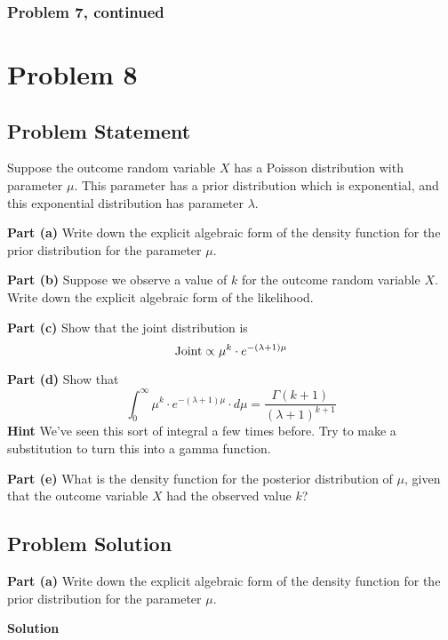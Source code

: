 \documentclass[12pt]{article}
\theoremstyle{definition}
\begin{document}
\newpage
\subsubsection*{Problem 7, continued}



\newpage
\section*{Problem 8}

\subsection*{Problem Statement}

Suppose the outcome random variable $X$ has a Poisson distribution with parameter $\mu$. This parameter has a prior distribution which is exponential, and this exponential distribution has parameter $\lambda$.

\bigskip
\noindent
{\bf Part (a)} Write down the explicit algebraic form of the density function for the prior distribution for the parameter $\mu$.

\bigskip
\noindent
{\bf Part (b)} Suppose we observe a value of $k$ for the outcome random variable $X$. Write down the explicit algebraic form of the likelihood.

\bigskip
\noindent
{\bf Part (c)} Show that the joint distribution is
$$
\hbox{Joint} \propto \mu^k \cdot e^{-(\lambda + 1) \mu}
$$

\bigskip
\noindent
{\bf Part (d)} Show that
$$
\int_0^\infty \mu^{k} \cdot e^{-(\lambda+1) \mu} \cdot d\mu = \frac{ \Gamma( k + 1 ) }{(\lambda + 1)^{k+1} }
$$
\noindent
{\bf Hint} We've seen this sort of integral a few times before. Try to make a substitution to turn this into a gamma function.

\bigskip
\noindent
{\bf Part (e)} What is the density function for the posterior distribution of $\mu$, given that the outcome variable $X$ had the observed value $k$?


\newpage
\subsection*{Problem Solution}

\noindent
{\bf Part (a)} Write down the explicit algebraic form of the density function for the prior distribution for the parameter $\mu$.

\bigskip
\noindent
{\bf Solution}
\end{document}
